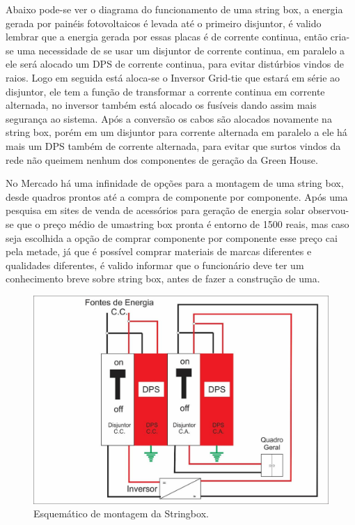 Abaixo pode-se ver o diagrama do funcionamento de uma string box, a energia gerada por painéis fotovoltaicos é levada até o primeiro disjuntor, é valido lembrar que a energia gerada por essas placas é de corrente continua, então cria-se uma necessidade de se usar um disjuntor de corrente continua, em paralelo a ele será alocado um DPS de corrente continua, para evitar distúrbios vindos de raios. Logo em seguida está aloca-se o Inversor Grid-tie que estará em série ao disjuntor, ele tem a função de transformar a corrente continua em corrente alternada, no inversor também está alocado os fusíveis dando assim mais segurança ao sistema. Após a conversão os cabos são alocados novamente na string box, porém em um disjuntor para corrente alternada em paralelo a ele há mais um DPS também de corrente alternada, para evitar que surtos vindos da rede não queimem nenhum dos componentes de geração da Green House.

	No Mercado há uma infinidade de opções para a montagem de uma string box, desde quadros prontos até a compra de componente por componente. Após uma pesquisa em sites de venda de acessórios para geração de energia solar observou-se que o preço médio de umastring box pronta é entorno de 1500 reais, mas caso seja escolhida a opção de comprar componente por componente esse preço cai pela metade, já que é possível comprar materiais de marcas diferentes e qualidades diferentes, é valido informar que o funcionário deve ter um conhecimento breve sobre string box, antes de fazer a construção de uma.

\begin{figure}[H]
\centering
\includegraphics[width=.75\linewidth,keepaspectratio,angle=0]{figuras/stringbox_esquematico.eps}
\caption{Esquemático de montagem da Stringbox.}
\label{stringbox_esquematico}
\end{figure}


